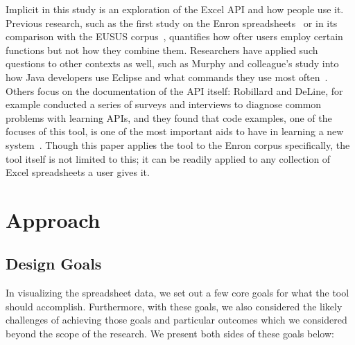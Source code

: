 \documentclass[conference]{IEEEtran}
\begin{document}
	Implicit in this study is an exploration of the Excel API and how people use
	it. Previous research, such as the first study on the Enron
	spreadsheets~\cite{hermans2015enron} or in its comparison with the EUSUS
	corpus~\cite{jansen2015enron}, quantifies how ofter users employ certain
	functions but not how they combine them. Researchers have applied such
	questions to other contexts as well, such as Murphy and colleague's study into
	how Java developers use Eclipse and what commands they use most
	often~\cite{murphy2006java}. Others focus on the documentation of the API
	itself: Robillard and DeLine, for example conducted a series of surveys and
	interviews to diagnose common problems with learning APIs, and they found that
	code examples, one of the focuses of this tool, is one of the most important
	aids to have in learning a new system~\cite{robillard2011field}. Though this
	paper applies the tool to the Enron corpus specifically, the tool itself is not
	limited to this; it can be readily applied to any collection of Excel
	spreadsheets a user gives it.
	
	\section{Approach}
	
	\subsection{Design Goals} \label{goals} In visualizing the spreadsheet data, we
	set out a few core goals for what the tool should accomplish. Furthermore, with
	these goals, we also considered the likely challenges of achieving those goals
	and particular outcomes which we considered beyond the scope of the research.
	We present both sides of these goals below:
	
\end{document}
